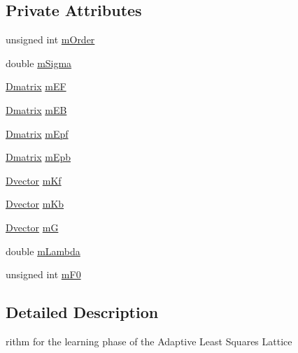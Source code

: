 \subsection*{Private Attributes}
\begin{DoxyCompactItemize}
\item 
unsigned int \hyperlink{classtsa_1_1_l_s_l_learning_ae1e400504ab5fc285b4b2d740e4bde72}{m\+Order}
\item 
double \hyperlink{classtsa_1_1_l_s_l_learning_a6ba93296df7efc898844ff3ef645b287}{m\+Sigma}
\item 
\hyperlink{namespacetsa_ad260cd21c1891c4ed391fe788569aba4}{Dmatrix} \hyperlink{classtsa_1_1_l_s_l_learning_abc6dbb01c7f1a1b4c1d6ee5cb6ba14e8}{m\+EF}
\item 
\hyperlink{namespacetsa_ad260cd21c1891c4ed391fe788569aba4}{Dmatrix} \hyperlink{classtsa_1_1_l_s_l_learning_aee8f5369206276f3a7faaaaa048485fb}{m\+EB}
\item 
\hyperlink{namespacetsa_ad260cd21c1891c4ed391fe788569aba4}{Dmatrix} \hyperlink{classtsa_1_1_l_s_l_learning_a5cd2595571d70a64dfefbdd48dd96eb5}{m\+Epf}
\item 
\hyperlink{namespacetsa_ad260cd21c1891c4ed391fe788569aba4}{Dmatrix} \hyperlink{classtsa_1_1_l_s_l_learning_a4ccb655fdbbebb1a9875c6bc8238b373}{m\+Epb}
\item 
\hyperlink{namespacetsa_a8900fb03d849baf447a1a0efe2561fb2}{Dvector} \hyperlink{classtsa_1_1_l_s_l_learning_ad651adf83f8b9e770446ccf7f41fe61d}{m\+Kf}
\item 
\hyperlink{namespacetsa_a8900fb03d849baf447a1a0efe2561fb2}{Dvector} \hyperlink{classtsa_1_1_l_s_l_learning_ac895dcbb7407c99df7c8703e27b53ca4}{m\+Kb}
\item 
\hyperlink{namespacetsa_a8900fb03d849baf447a1a0efe2561fb2}{Dvector} \hyperlink{classtsa_1_1_l_s_l_learning_a4dc069522ea6f00876e144b7c26a8056}{mG}
\item 
double \hyperlink{classtsa_1_1_l_s_l_learning_a15b3df249118e9c6699a39a4b4add1db}{m\+Lambda}
\item 
unsigned int \hyperlink{classtsa_1_1_l_s_l_learning_ab1e86d5df54de8730402c123caccfd30}{m\+F0}
\end{DoxyCompactItemize}


\subsection{Detailed Description}
rithm for the learning phase of the Adaptive Least Squares Lattice 

